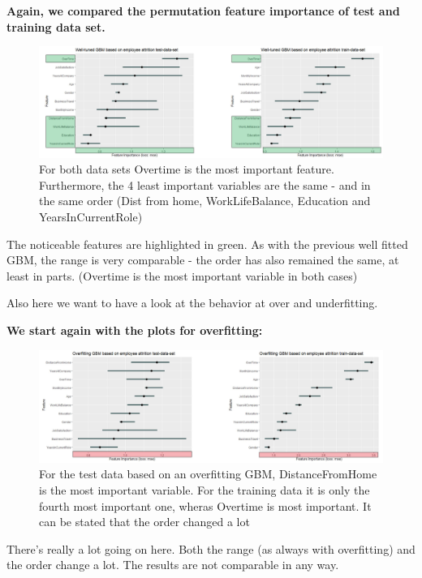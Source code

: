 \documentclass[]{krantz}
\begin{document}
\textbf{Again, we compared the permutation feature importance of test
and training data set.}

\begin{figure}
\includegraphics[width=40.38in]{images/IBM_well} \caption{For both data sets Overtime is the most important feature. Furthermore, the 4 least important variables are the same - and in the same order (Dist from home, WorkLifeBalance, Education and YearsInCurrentRole)}\label{fig:unnamed-chunk-57}
\end{figure}

The noticeable features are highlighted in green. As with the previous
well fitted GBM, the range is very comparable - the order has also
remained the same, at least in parts. (Overtime is the most important
variable in both cases)

Also here we want to have a look at the behavior at over and
underfitting.

\textbf{We start again with the plots for overfitting:}

\begin{figure}
\includegraphics[width=40.1in]{images/IBM_over} \caption{For the test data based on an overfitting GBM, DistanceFromHome is the most important variable. For the training data it is only the fourth most important one, wheras Overtime is most important. It can be stated that the order changed a lot}\label{fig:unnamed-chunk-58}
\end{figure}

There's really a lot going on here. Both the range (as always with
overfitting) and the order change a lot. The results are not comparable
in any way.
\end{document}
